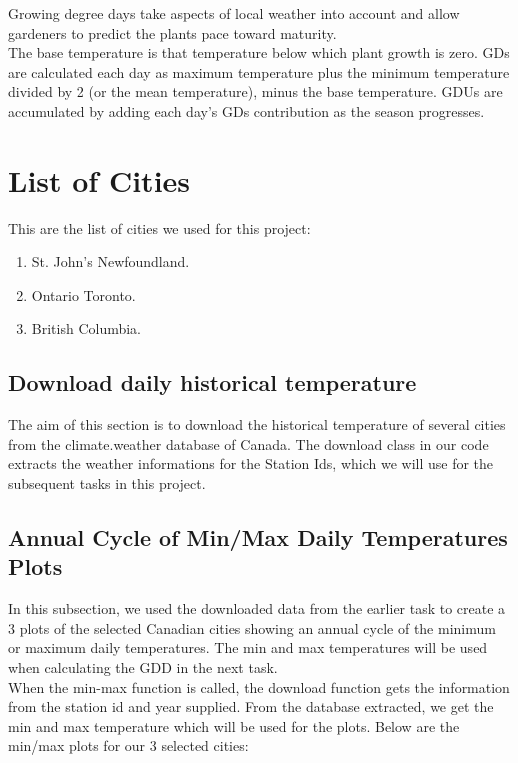Growing degree days take aspects of local weather into account and allow gardeners to predict the plants pace toward maturity.\\

The base temperature is that temperature below which plant growth is zero. GDs are calculated each day as maximum temperature plus the minimum temperature divided by 2 (or the mean temperature), minus the base temperature. GDUs are accumulated by adding each day’s GDs contribution as the season progresses.


\section{List of Cities }
This are the list of cities we used for this project:
\begin{enumerate}
\item St. John's Newfoundland.
\item Ontario Toronto.
\item British Columbia.
\end{enumerate}
\label{sec:examples}

\subsection{Download daily historical temperature}
The aim of this section is to download the historical temperature of several cities from the climate.weather database of Canada. The download class in our code extracts the weather informations for the Station Ids, which we will use for the subsequent tasks in this project.   



\subsection{Annual Cycle of Min/Max Daily Temperatures Plots }
In this subsection, we used the downloaded data from the earlier task to create a 3 plots of the selected Canadian cities showing an annual cycle of the minimum or maximum daily temperatures. The min and max temperatures will be used when calculating the GDD in the next task. \\
When the min-max function is called, the download function gets the information from the station id and year supplied. From the database extracted, we get the min and max temperature  which will be used for the plots. 
Below are the min/max plots for our 3 selected cities:\\


